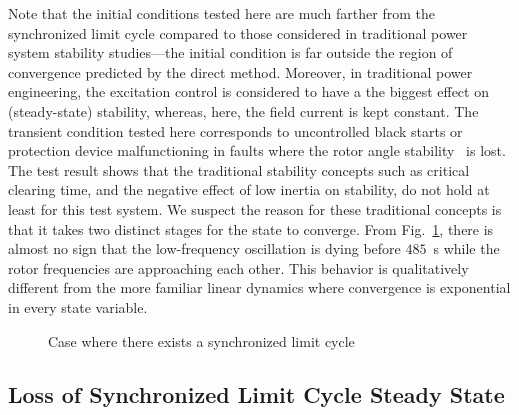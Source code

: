 Note that the initial conditions tested here are much farther from the synchronized limit cycle compared to those considered in traditional power system stability studies---the initial condition is far outside the region of convergence predicted by the direct method. Moreover, in traditional power engineering, the excitation control is considered to have a the biggest effect on (steady-state) stability, whereas, here, the field current is kept constant. The transient condition tested here corresponds to uncontrolled black starts or protection device malfunctioning in faults where the rotor angle stability~\cite{tziouvaras2004out} is lost. The test result shows that the traditional stability concepts such as critical clearing time, and the negative effect of low inertia on stability, do not hold at least for this test system. We suspect the reason for these traditional concepts is that it takes two distinct stages for the state to converge. From Fig.~\ref{fig_regular}, there is almost no sign that the low-frequency oscillation is dying before $485$~\unit{s} while the rotor frequencies are approaching each other. This behavior is qualitatively different from the more familiar linear dynamics where convergence is exponential in every state variable. %



\begin{figure}[!t]
\centering 
{}
\hfil
{}\hspace{0.03in}
\caption{Case where there exists a synchronized limit cycle}
\label{fig_regular}
\hfill\end{figure}







\subsection{Loss of Synchronized Limit Cycle Steady State}

